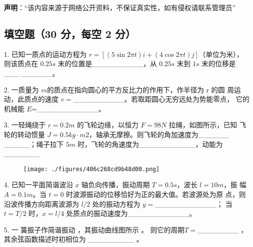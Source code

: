 
\textbf{声明}：“该内容来源于网络公开资料，不保证真实性，如有侵权请联系管理员”

\subsection{填空题（30 分，每空 2 分）}
1. 已知一质点的运动方程为 $r=\left[(5\sin2\pi t)i+(4\cos2\pi t)j\right]$（单位为米），则该质点在 $0.25s$ 末的位置是__________，从 $0.25s$ 末到 $1s$ 末的位移是___
______。

2. 一质量为 $m$的质点在指向圆心的平方反比力的作用下，作半径为 r 的圆
周运动，此质点的速度 $v=$__________。若取距圆心无穷远处为势能零点，
它的机械能 $E$=____________。

3. 一轻绳绕于 $r=0.2m$ 的飞轮边缘，以恒力 $F=98N$ 拉绳，如图所示，已知
飞轮的转动惯量 $J=0.5kg\cdot m2$，轴承无摩擦。则飞轮的角加速度为______
_____；绳子拉下 $5m$ 时，飞轮的角速度为___________，动能为_______
\begin{figure}[ht]
\centering
\texttt{[image: ./figures/406c268cd9b48d00.png]}
\caption{} \label{fig_NJUD2_1}
\end{figure}
4. 已知一平面简谐波沿 $x$ 轴负向传播，振动周期 $T=0.5s$，波长 $l=10m$，振
幅 $A=0.1m$。当 $t=0$ 时波源振动的位移恰好为正的最大值。若波源处为原
点，则沿波传播方向距离波源为 $l/2$ 处的振动方程为 $y=$____________；
当 $t=T/2$ 时，$x=l/4$ 处质点的振动速度为____________。

5. 一 簧振子作简谐振动 ，其振动曲线图所示 。 则它的周期$T=$________ ， 其余弦函数描述时初相位为 _________ 。
